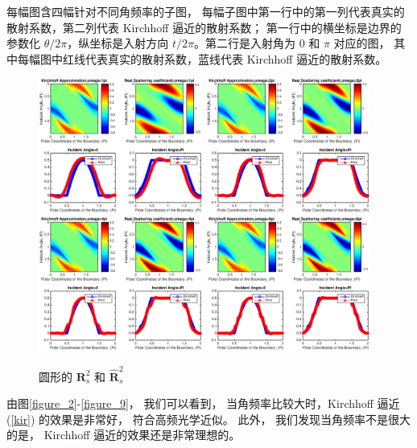 { 每幅图含四幅针对不同角频率的子图， 每幅子图中第一行中的第一列代表真实的散射系数，第二列代表 Kirchhoff 逼近的散射系数； 第一行中的横坐标是边界的参数化 $\theta/2\pi$，纵坐标是入射方向 $t/2\pi$。第二行是入射角为 $0$ 和 $\pi$ 对应的图， 其中每幅图中红线代表真实的散射系数，蓝线代表 Kirchhoff 逼近的散射系数。
\begin{figure}[htbp]
	\centering
	\includegraphics[width=0.48\textwidth]{./Img/figure_sc_elastic/sc_s2_circle_1.eps}
	\includegraphics[width=0.48\textwidth]{./Img/figure_sc_elastic/sc_s2_circle_2.eps}
	\includegraphics[width=0.48\textwidth]{./Img/figure_sc_elastic/sc_s2_circle_4.eps}
	\includegraphics[width=0.48\textwidth]{./Img/figure_sc_elastic/sc_s2_circle_8.eps}		
	\caption{圆形的 $\mathbf{R}_s^2$ 和 $\hat {\mathbf{R}}_s^2$ }\label{figure_5}
\end{figure}
由图\ref{figure_2}-\ref{figure_9}， 我们可以看到， 当角频率比较大时，Kirchhoff 逼近 (\ref{kir}) 的效果是非常好， 符合高频光学近似。 此外， 我们发现当角频率不是很大的是， Kirchhoff 逼近的效果还是非常理想的。

}
